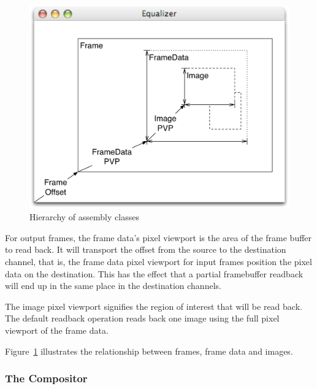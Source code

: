 \documentclass[10pt,a4]{scrartcl}
\newcommand{\fig}[1]{Figure~\ref{#1}}
\begin{document}
\begin{figure}
  \includegraphics[width=.618\textwidth]{images/assembly.pdf}
  {\caption{\label{fAssembly}Hierarchy of assembly classes}}
\end{figure}
For output frames, the frame data's pixel viewport is the area of the
frame buffer to read back. It will transport the offset from the source
to the destination channel, that is, the frame data pixel viewport for
input frames position the pixel data on the destination. This has the
effect that a partial framebuffer readback will end up in the same place
in the destination channels.

The image pixel viewport signifies the region of interest that will be read
back. The default readback operation reads back one image using the full
pixel viewport of the frame data.

\fig{fAssembly} illustrates the relationship between frames, frame data
and images.

\subsubsection{\label{sCompositor}The Compositor}
\end{document}
